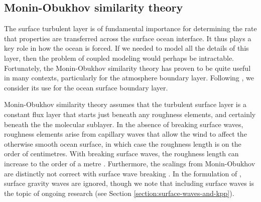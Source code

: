 \subsection{Monin-Obukhov similarity theory}
\label{subsection:m-o-similarity-theory}

The surface turbulent layer is of fundamental importance for
determining the rate that properties are transferred across the
surface ocean interface.  It thus plays a key role in how the ocean is
forced.  If we needed to model all the details of this layer, then the
problem of coupled modeling would perhaps be intractable.
Fortunately, the Monin-Obukhov similarity theory has proven to be
quite useful in many contexts, particularly for the atmosphere
boundary layer.  Following \cite{LargeKPP}, we consider its use for
the ocean surface boundary layer.

Monin-Obukhov similarity theory assumes that the turbulent surface
layer is a constant flux layer that starts just beneath any roughness
elements, and certainly beneath the the molecular sublayer.  In the
absence of breaking surface waves, roughness elements arise from
capillary waves that allow the wind to affect the otherwise smooth
ocean surface, in which case the roughness length is on the order of
centimetres.  With breaking surface waves, the roughness length can
increase to the order of a metre \citep[e.g., see concluding section
to][]{Craig_Banner_1994}.  Furthermore, the scalings from
Monin-Obukhov are distinctly not correct with surface wave breaking
\citep[e.g.,][]{Craig_Banner_1994,Terray_etal1996}.  In the
formulation of \cite{LargeKPP}, surface gravity waves are ignored,
though we note that including surface waves is the topic of ongoing
research (see Section \ref{section:surface-waves-and-kpp}).

